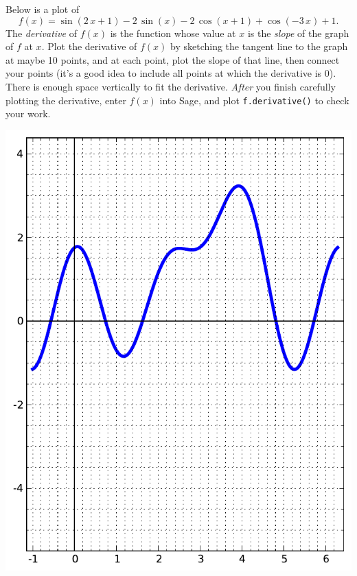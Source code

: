 Below is a plot of $$f(x)=\sin\left(2 \, x + 1\right) - 2 \, \sin\left(x\right) - 2 \, \cos\left(x + 1\right) + \cos\left(-3 \, x\right) + 1.$$  The {\em \color{red}derivative} of $f(x)$ is the function whose value at $x$ is the {\em slope} of the graph of $f$ at $x$.  Plot the derivative of $f(x)$ by sketching the tangent line to the graph at maybe 10 points, and at each point, plot the slope of that line, then connect your points (it's a good idea to include all points at which the derivative is 0).  There is enough space vertically to fit the derivative.  {\em After} you finish carefully plotting the derivative, enter $f(x)$ into Sage, and plot {\color{blue}\verb|f.derivative()|} to check your work.
\begin{center}\includegraphics{functions/52.pdf}\end{center}\newpage

